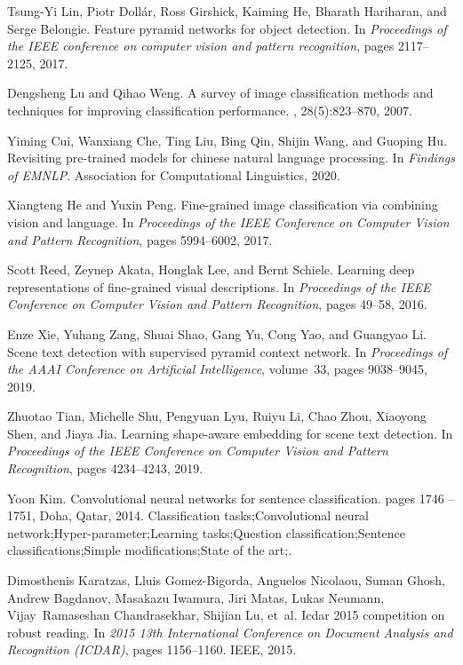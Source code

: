 \documentclass[review]{cvpr}
\begin{document}
{\begin{thebibliography}{10}
Tsung-Yi Lin, Piotr Doll{\'a}r, Ross Girshick, Kaiming He, Bharath Hariharan,
  and Serge Belongie.
\newblock Feature pyramid networks for object detection.
\newblock In {\em Proceedings of the IEEE conference on computer vision and
  pattern recognition}, pages 2117--2125, 2017.



Dengsheng Lu and Qihao Weng.
\newblock A survey of image classification methods and techniques for improving
  classification performance.
, 28(5):823--870, 2007.


Yiming Cui, Wanxiang Che, Ting Liu, Bing Qin, Shijin Wang, and Guoping Hu.
\newblock Revisiting pre-trained models for chinese natural language
  processing.
\newblock In {\em Findings of EMNLP}. Association for Computational
  Linguistics, 2020.


Xiangteng He and Yuxin Peng.
\newblock Fine-grained image classification via combining vision and language.
\newblock In {\em Proceedings of the IEEE Conference on Computer Vision and
  Pattern Recognition}, pages 5994--6002, 2017.



Scott Reed, Zeynep Akata, Honglak Lee, and Bernt Schiele.
\newblock Learning deep representations of fine-grained visual descriptions.
\newblock In {\em Proceedings of the IEEE Conference on Computer Vision and
  Pattern Recognition}, pages 49--58, 2016.


Enze Xie, Yuhang Zang, Shuai Shao, Gang Yu, Cong Yao, and Guangyao Li.
\newblock Scene text detection with supervised pyramid context network.
\newblock In {\em Proceedings of the AAAI Conference on Artificial
  Intelligence}, volume~33, pages 9038--9045, 2019.




Zhuotao Tian, Michelle Shu, Pengyuan Lyu, Ruiyu Li, Chao Zhou, Xiaoyong Shen,
  and Jiaya Jia.
\newblock Learning shape-aware embedding for scene text detection.
\newblock In {\em Proceedings of the IEEE Conference on Computer Vision and
  Pattern Recognition}, pages 4234--4243, 2019.

Yoon Kim.
\newblock Convolutional neural networks for sentence classification.
\newblock pages 1746 -- 1751, Doha, Qatar, 2014.
\newblock Classification tasks;Convolutional neural
  network;Hyper-parameter;Learning tasks;Question classification;Sentence
  classifications;Simple modifications;State of the art;.


Dimosthenis Karatzas, Lluis Gomez-Bigorda, Anguelos Nicolaou, Suman Ghosh,
  Andrew Bagdanov, Masakazu Iwamura, Jiri Matas, Lukas Neumann,
  Vijay~Ramaseshan Chandrasekhar, Shijian Lu, et~al.
\newblock Icdar 2015 competition on robust reading.
\newblock In {\em 2015 13th International Conference on Document Analysis and
  Recognition (ICDAR)}, pages 1156--1160. IEEE, 2015.


\end{thebibliography}

}
\end{document}
